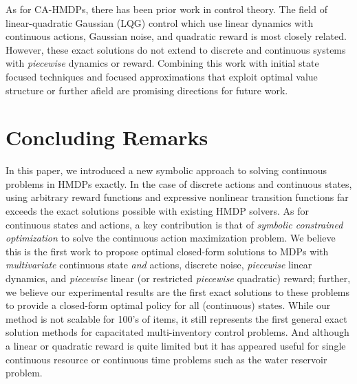 \documentclass[twoside,11pt]{article}
\newcommand{\InventoryControl}{\textsc{Inventory Control }}
\begin{document}
As for CA-HMDPs, there has been prior work in control theory. The field of linear-quadratic Gaussian (LQG) control \cite{lqgc} which use linear dynamics with continuous actions, Gaussian noise, and quadratic
reward is most closely related.  However, these exact solutions do
not extend to discrete and continuous systems with \emph{piecewise}
dynamics or reward.
%
Combining this work with initial state focused techniques \cite{hao09}
and focused approximations that exploit optimal value
structure \cite{apricodd} or further
afield \cite{munos02,kveton06,phase07} are promising directions for
future work.


\section{Concluding Remarks}

In this paper, we introduced a new symbolic approach to solving continuous problems in HMDPs exactly. In the case of discrete actions and continuous states, using arbitrary
reward functions and expressive nonlinear transition functions far exceeds the exact solutions possible with existing HMDP
solvers.  
As for continuous states and actions, a key contribution is that of \emph{symbolic constrained
optimization} to solve the continuous action maximization problem. We
believe this is the first work to propose optimal closed-form
solutions to MDPs with \emph{multivariate} continuous state \emph{and}
actions, discrete noise, \emph{piecewise} linear dynamics, and
\emph{piecewise} linear (or restricted \emph{piecewise} quadratic)
reward; further, we believe our experimental results are the first
exact solutions to these problems to provide a closed-form optimal
policy for all (continuous) states.
While our method is not scalable for 100's of items, it still represents
the first general exact solution methods for capacitated multi-inventory control problems. 
And although a linear or quadratic reward is quite limited but it has appeared useful for single continuous resource or continuous time problems such as the water reservoir problem. 
\end{document}
